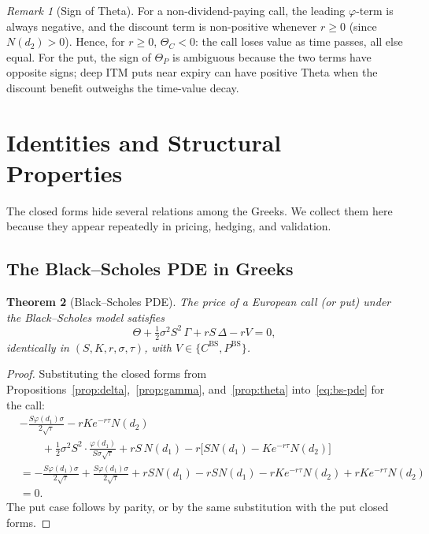 \documentclass[11pt,a4paper]{article}
\theoremstyle{plain}
\newtheorem{theorem}{Theorem}[section]
\theoremstyle{definition}
\theoremstyle{remark}
\newtheorem{remark}[theorem]{Remark}
\newcommand{\BS}{\mathrm{BS}}
\begin{document}
\begin{remark}[Sign of Theta]
For a non-dividend-paying call, the leading \(\varphi\)-term is always
negative, and the discount term is non-positive whenever \(r \geq 0\)
(since \(N(d_2) > 0\)). Hence, for \(r \geq 0\), \(\Theta_C < 0\): the
call loses value as time passes, all else equal. For the put, the
sign of \(\Theta_P\) is ambiguous because the two terms have opposite
signs; deep ITM puts near expiry can have positive Theta when the
discount benefit outweighs the time-value decay.
\end{remark}

\section{Identities and Structural Properties}

The closed forms hide several relations among the Greeks. We collect
them here because they appear repeatedly in pricing, hedging, and
validation.

\subsection{The Black--Scholes PDE in Greeks}

\begin{theorem}[Black--Scholes PDE]
\label{thm:bs-pde}
The price of a European call (or put) under the Black--Scholes model
satisfies
\begin{equation}
    \Theta + \tfrac{1}{2}\sigma^2 S^2\, \Gamma + r S\, \Delta - r V = 0,
    \label{eq:bs-pde}
\end{equation}
identically in \((S, K, r, \sigma, \tau)\), with \(V \in \{C^{\BS}, P^{\BS}\}\).
\end{theorem}

\begin{proof}
Substituting the closed forms from
Propositions~\ref{prop:delta},~\ref{prop:gamma}, and~\ref{prop:theta}
into~\eqref{eq:bs-pde} for the call:
\begin{align*}
&-\frac{S\varphi(d_1)\sigma}{2\sqrt{\tau}} - rKe^{-r\tau} N(d_2) \\
&\qquad + \tfrac{1}{2}\sigma^2 S^2 \cdot \frac{\varphi(d_1)}{S\sigma\sqrt{\tau}}
    + r S\, N(d_1) - r\bigl[S N(d_1) - K e^{-r\tau} N(d_2)\bigr] \\
&= -\frac{S\varphi(d_1)\sigma}{2\sqrt{\tau}} + \frac{S\varphi(d_1)\sigma}{2\sqrt{\tau}}
    + r S N(d_1) - r S N(d_1) - r K e^{-r\tau} N(d_2) + r K e^{-r\tau} N(d_2) \\
&= 0.
\end{align*}
The put case follows by parity, or by the same substitution with the
put closed forms.
\end{proof}
\end{document}
